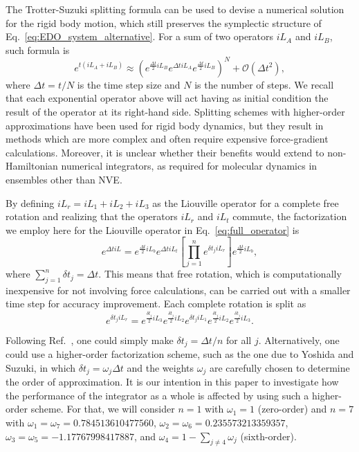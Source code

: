 \documentclass[aip,jcp,reprint,amsmath,amssymb,amsfont]{revtex4-1}
\begin{document}
The Trotter-Suzuki splitting formula\cite{Trotter1959, Suzuki1976} can be used to devise a numerical solution for the rigid body motion, which still preserves the symplectic structure of Eq.~\ref{eq:EDO_system_alternative}. For a sum of two operators $i\!L_A$ and $i\!L_B$, such formula is
\[
e^{t(i\!L_A + i\!L_B)} \approx \left( e^{\frac{\Delta t}{2} i\!L_B} e^{\Delta t i\!L_A} e^{\frac{\Delta t}{2} i\!L_B} \right)^N + \mathcal{O}(\Delta t^2),
\]
where $\Delta t = t/N$ is the time step size and $N$ is the number of steps. We recall that each exponential operator above will act having as initial condition the result of the operator at its right-hand side. Splitting schemes with higher-order approximations have been used for rigid body dynamics,\cite{Omelyan2007, Omelyan2008, vanZon2008} but they result in methods which are more complex and often require expensive force-gradient calculations. Moreover, it is unclear whether their benefits would extend to non-Hamiltonian numerical integrators, as required for molecular dynamics in ensembles other than NVE.

By defining $i\!L_r = i\!L_1 + i\!L_2 + i\!L_3$ as the Liouville operator for a complete free rotation and realizing that the operators $i\!L_r$ and $i\!L_t$ commute, the factorization we employ here for the Liouville operator in Eq.~\ref{eq:full_operator} is
\begin{equation}
\label{eq:trotter_splitting_NVE}
e^{\Delta t i\!L} = e^{\frac{\Delta t}{2} i\!L_b} e^{\Delta t i\!L_t} \left[ \prod_{j=1}^n e^{{\delta t}_j i\!L_{r}} \right] e^{\frac{\Delta t}{2} i\!L_b},
\end{equation}
where $\sum_{j=1}^n {\delta t}_j = \Delta t$. This means that free rotation, which is computationally inexpensive for not involving force calculations, can be carried out with a smaller time step for accuracy improvement. Each complete rotation is split as\cite{Miller2002}
\begin{equation}
\label{eq:splitting_rot}
e^{\delta t_j i\!L_r} = e^{\frac{\delta t_j}{2} i\!L_3} e^{\frac{\delta t_j}{2} i\!L_2} e^{\delta t_j i\!L_1} e^{\frac{\delta t_j}{2} i\!L_2} e^{\frac{\delta t_j}{2} i\!L_3}.
\end{equation}

Following Ref.~, one could simply make $\delta t_j = \Delta t/n$ for all $j$. Alternatively, one could use a higher-order factorization scheme, such as the one due to Yoshida\cite{Yoshida1990} and Suzuki,\cite{Suzuki1991a, Suzuki1991b} in which $\delta t_j = \omega_j \Delta t$ and the weights $\omega_j$ are carefully chosen to determine the order of approximation. It is our intention in this paper to investigate how the performance of the integrator as a whole is affected by using such a higher-order scheme. For that, we will consider $n = 1$ with $\omega_1 = 1$ (zero-order) and $n = 7$ with $\omega_1 = \omega_7 = 0.784513610477560$, $\omega_2 = \omega_6 = 0.235573213359357$, $\omega_3 = \omega_5 = -1.17767998417887$, and $\omega_4 = 1 - \sum_{j \neq 4} \omega_j$ (sixth-order).
\end{document}

